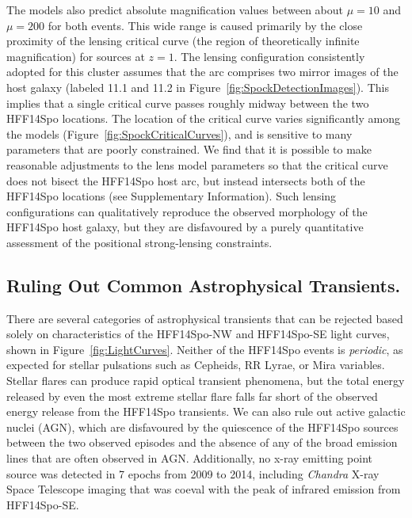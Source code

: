 \documentclass{article}
\def\Chandra{{\it Chandra}\xspace}
\def\spock{HFF14Spo\xspace}
\def\spockone{HFF14Spo-NW\xspace}
\def\spocktwo{HFF14Spo-SE\xspace}
\begin{document}
The models also predict absolute magnification values between about
$\mu=10$ and $\mu=200$ for both events. This wide range is caused
primarily by the close proximity of the lensing critical curve (the
region of theoretically infinite magnification) for sources at $z=1$.
The lensing configuration consistently adopted for this cluster
assumes that the arc comprises two mirror images of the host galaxy
(labeled 11.1 and 11.2 in
Figure~\ref{fig:SpockDetectionImages})\cite{Zitrin:2013a, Jauzac:2014,
  Johnson:2014, Richard:2014, Diego:2015a, Grillo:2015, Hoag:2016,
  Sebesta:2016, Caminha:2017}.  This implies that a single critical
curve passes roughly midway between the two \spock locations.  The
location of the critical curve varies significantly among the models
(Figure~\ref{fig:SpockCriticalCurves}), and is sensitive to many
parameters that are poorly constrained. We find that it is possible to
make reasonable adjustments to the lens model parameters so that the
critical curve does not bisect the \spock host arc, but instead
intersects both of the \spock locations (see Supplementary
Information).  Such lensing configurations can
qualitatively reproduce the observed morphology of the \spock host
galaxy, but they are disfavoured by a purely quantitative assessment of
the positional strong-lensing constraints.

\subsection{Ruling Out Common Astrophysical Transients.}

There are several categories of astrophysical transients that can be
rejected based solely on characteristics of the \spockone and
\spocktwo light curves, shown in Figure~\ref{fig:LightCurves}. Neither
of the \spock events is {\it periodic}, as expected for stellar
pulsations such as Cepheids, RR Lyrae, or Mira variables. Stellar
flares can produce rapid optical transient phenomena, but the total
energy released by even the most extreme stellar
flare\cite{Karoff:2016} falls far short of the observed energy release
from the \spock transients. We can also rule out active galactic
nuclei (AGN), which are disfavoured by the quiescence of the \spock
sources between the two observed episodes and the absence of any of
the broad emission lines that are often observed in AGN.
Additionally, no x-ray emitting point source was detected in 7 epochs
from 2009 to 2014, including \Chandra X-ray Space Telescope imaging
that was coeval with the peak of infrared emission from \spocktwo.
\end{document}
